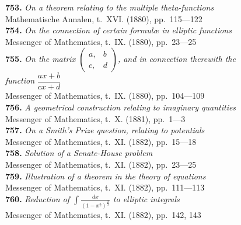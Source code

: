 \documentclass[11pt,a4paper]{book}
\begin{document}
\textbf{753.} \textit{On a theorem relating to the multiple theta-functions} \\
\hspace*{2em}Mathematische Annalen, t.~XVI. (1880), pp.~115---122\\[0.3em]
\textbf{754.} \textit{On the connection of certain formul\ae{} in elliptic functions} \\
\hspace*{2em}Messenger of Mathematics, t.~IX. (1880), pp.~23---25\\[0.3em]
\textbf{755.} \textit{On the matrix $\begin{pmatrix} a, & b \\ c, & d \end{pmatrix}$, and in connection therewith the}\\
\hspace*{2em}\textit{function} $\dfrac{ax+b}{cx+d}$ \\
\hspace*{2em}Messenger of Mathematics, t.~IX. (1880), pp.~104---109\\[0.3em]
\textbf{756.} \textit{A geometrical construction relating to imaginary quantities} \\
\hspace*{2em}Messenger of Mathematics, t.~X. (1881), pp.~1---3\\[0.3em]
\textbf{757.} \textit{On a Smith's Prize question, relating to potentials} \\
\hspace*{2em}Messenger of Mathematics, t.~XI. (1882), pp.~15---18\\[0.3em]
\textbf{758.} \textit{Solution of a Senate-House problem} \\
\hspace*{2em}Messenger of Mathematics, t.~XI. (1882), pp.~23---25\\[0.3em]
\textbf{759.} \textit{Illustration of a theorem in the theory of equations} \\
\hspace*{2em}Messenger of Mathematics, t.~XI. (1882), pp.~111---113\\[0.3em]
\textbf{760.} \textit{Reduction of $\displaystyle\int\!\frac{dx}{(1-x^2)^{\frac{2}{3}}}$ to elliptic integrals} \\
\hspace*{2em}Messenger of Mathematics, t.~XI. (1882), pp.~142, 143\\[0.3em]
\end{document}
